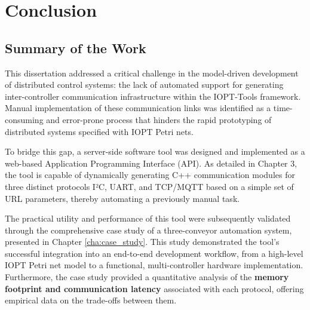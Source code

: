 
%

\chapter{Conclusion}
\label{cha:conclusion}

\section{Summary of the Work}
\label{sec:summary}

This dissertation addressed a critical challenge in the model-driven development of distributed control systems: the lack of automated support for generating inter-controller communication infrastructure within the IOPT-Tools framework. Manual implementation of these communication links was identified as a time-consuming and error-prone process that hinders the rapid prototyping of distributed systems specified with IOPT Petri nets.

To bridge this gap, a server-side software tool was designed and implemented as a web-based Application Programming Interface (API). As detailed in Chapter 3, the tool is capable of dynamically generating C++ communication modules for three distinct protocols I²C, UART, and TCP/MQTT                                                                                                                                                                                                                                                                                                                                                                                                                                                                                                                                                      based on a simple set of URL parameters, thereby automating a previously manual task.

The practical utility and performance of this tool were subsequently validated through the comprehensive case study of a three-conveyor automation system, presented in Chapter \ref{cha:case_study}. This study demonstrated the tool's successful integration into an end-to-end development workflow, from a high-level IOPT Petri net model to a functional, multi-controller hardware implementation. Furthermore, the case study provided a quantitative analysis of the  \textbf{memory footprint and communication latency} associated with each protocol, offering empirical data on the trade-offs between them.



